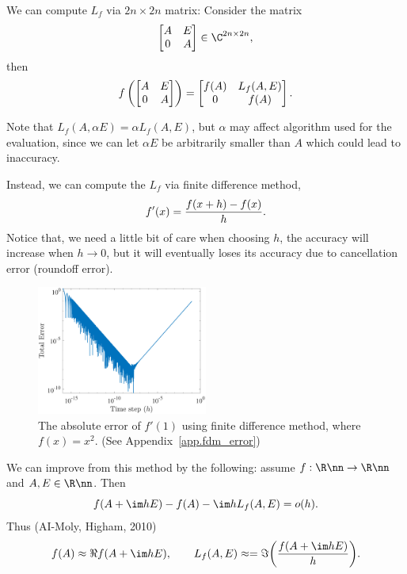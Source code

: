 \documentclass{article}
\begin{document}
We can compute $L_f$ via $2n\times 2n$ matrix: Consider the matrix 
\begin{equation}\notag
    \begin{bmatrix}
        A & E \\ 0 & A
    \end{bmatrix} \in \C^{2n \times 2n},
\end{equation}
then 
\begin{equation}\notag
    f\left(\begin{bmatrix}
        A & E \\ 0 & A
    \end{bmatrix}\right) = 
    \begin{bmatrix}
        f(A) & L_f(A,E) \\ 0 & f(A)
    \end{bmatrix}.
\end{equation}

Note that $L_f(A,\alpha E) = \alpha L_f(A,E)$, but $\alpha$ may affect
algorithm used for the evaluation, since we can let $\alpha E$ be
arbitrarily smaller than $A$ which could lead to inaccuracy.

Instead, we can compute the $L_f$ via finite difference method, 
\begin{equation}\notag
    f'(x) = \frac{f(x+h) - f(x)}{h}.
\end{equation}
Notice that, we need a little bit of care when choosing $h$, the
accuracy will increase when $h\to 0$, but it will eventually loses its
accuracy due to cancellation error (roundoff error).

\begin{figure}[H]
    \centering
    \includegraphics[width=0.5\textwidth]{matlab/totalerror.pdf}
    \caption{The absolute error of $f'(1)$ using finite difference
    method, where $f(x) = x^2$. (See Appendix~\ref{app.fdm_error})}
    \label{fig:FDM_error}
\end{figure}

We can improve from this method by the following: assume $f:\R\nn\to
\R\nn$ and $A,E\in\R\nn$. Then 
\begin{equation}\notag
    f(A + \im hE) - f(A) - \im hL_f(A,E) = o(h).
\end{equation}
Thus (AI-Moly, Higham, 2010)
\begin{equation}\notag
    f(A) \approx \Re{f(A + \im hE)}, \qquad L_f(A,E) \approx = \Im {\left({f(A
      + \im hE)\over h}\right)}.
\end{equation}
\end{document}
